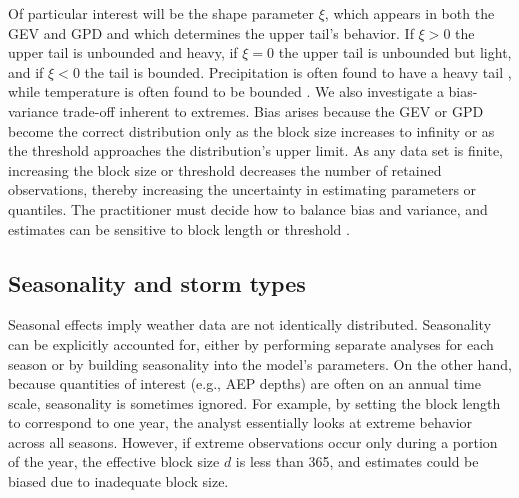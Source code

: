\documentclass{ametsocV6.1}
\begin{document}
Of particular interest will be the shape parameter $\xi$, which appears in both the GEV and GPD and which determines the upper tail's behavior.
If $\xi > 0$ the upper tail is unbounded and heavy, if $\xi = 0$ the upper tail is unbounded but light, and if $\xi < 0$ the tail is bounded.
Precipitation is often found to have a heavy tail \citep{nasem2024pmp}, while temperature is often found to be bounded \citep[e.g.,][]{philip2022rapid,bercos2022anthropogenic}.
We also investigate a bias-variance trade-off inherent to extremes.
Bias arises because the GEV or GPD become the correct distribution only as the block size increases to infinity or as the threshold approaches the distribution's upper limit.
As any data set is finite, increasing the block size or threshold decreases the number of retained observations, thereby increasing the uncertainty in estimating parameters or quantiles.
The practitioner must decide how to balance bias and variance, and estimates can be sensitive to block length or threshold \citep[e.g.,][]{ben2020evaluation}. 


\subsection{Seasonality and storm types}


Seasonal effects imply weather data are not identically distributed.
Seasonality can be explicitly accounted for, either by performing separate analyses for each season or by building seasonality into the model's parameters.
On the other hand, because quantities of interest (e.g., AEP depths) are often on an annual time scale, seasonality is sometimes ignored.
For example, by setting the block length to correspond to one year, the analyst essentially looks at extreme behavior across all seasons.
However, if extreme observations occur only during a portion of the year, the effective block size $d$ is less than 365, and estimates could be biased due to inadequate block size.
\end{document}

